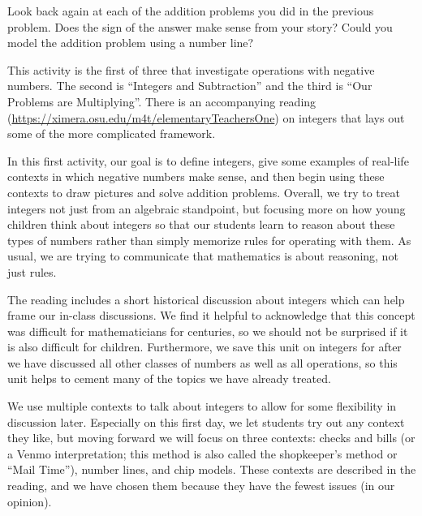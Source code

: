 \documentclass[ nooutcomes,noauthor,handout]{ximera}
\begin{document}
\begin{problem}
Look back again at each of the addition problems you did in the previous problem.  Does the sign of the answer make sense from your story?  Could you model the addition problem using a number line?

\end{problem}


\newpage
\begin{instructorNotes}
This activity is the first of three that investigate operations with negative numbers.  The second is ``Integers and Subtraction'' and the third is ``Our Problems are Multiplying''.  There is an accompanying reading (\url{https://ximera.osu.edu/m4t/elementaryTeachersOne}) on integers that lays out some of the more complicated framework.

In this first activity, our goal is to define integers, give some examples of real-life contexts in which negative numbers make sense, and then begin using these contexts to draw pictures and solve addition problems.  Overall, we try to treat integers not just from an algebraic standpoint, but focusing more on how young children think about integers so that our students learn to reason about these types of numbers rather than simply memorize rules for operating with them.  As usual, we are trying to communicate that mathematics is about reasoning, not just rules.

The reading includes a short historical discussion about integers which can help frame our in-class discussions.  We find it helpful to acknowledge that this concept was difficult for mathematicians for centuries, so we should not be surprised if it is also difficult for children.  Furthermore, we save this unit on integers for after we have discussed all other classes of numbers as well as all operations, so this unit helps to cement many of the topics we have already treated.

We use multiple contexts to talk about integers to allow for some flexibility in discussion later.  Especially on this first day, we let students try out any context they like, but moving forward we will focus on three contexts: checks and bills (or a Venmo interpretation; this method is also called the shopkeeper's method or ``Mail Time''), number lines, and chip models.  These contexts are described in the reading, and we have chosen them because they have the fewest issues (in our opinion).


\end{instructorNotes}
\end{document}

